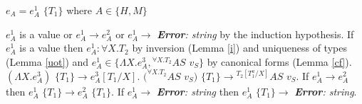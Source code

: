 \begin{case}

$e_{A}=e_{A}^{1}$ $\lbrace T_{1}\rbrace$ where $A\in\lbrace H,M\rbrace$

$e_{A}^{1}$ is a value or $e_{A}^{1}\rightarrow e_{A}^{2}$ or $e_{A}^{1}\rightarrow$ \emph{\textbf{Error}: string} by the induction hypothesis.  If $e_{A}^{1}$ is a value then $e_{A}^{1}:\forall X.T_{2}$ by inversion (Lemma \ref{i}) and uniqueness of types (Lemma \ref{uot}) and $e_{A}^{1}\in\lbrace\Lambda X.e_{A}^{3},{^{\forall X.T_{2}}A}S$ $v_{S}\rbrace$ by canonical forms (Lemma \ref{cf}).  $(\Lambda X.e_{A}^{3})$ $\lbrace T_{1}\rbrace\rightarrow e_{A}^{3}[T_{1}/X]$.  $(^{\forall X.T_{2}}AS$ $v_{S})$ $\lbrace T_{1}\rbrace\rightarrow{^{T_{2}[T_{1}^{a}/X]}A}S$ $v_{S}$.  If $e_{A}^{1}\rightarrow e_{A}^{2}$ then $e_{A}^{1}$ $\lbrace T_{1}\rbrace\rightarrow e_{A}^{2}$ $\lbrace T_{1}\rbrace$.  If $e_{A}^{1}\rightarrow$ \emph{\textbf{Error}: string} then $e_{A}^{1}$ $\lbrace T_{1}\rbrace\rightarrow$ \emph{\textbf{Error}: string}.

\end{case}